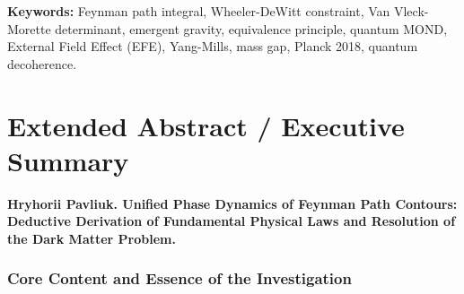 \documentclass[11pt,a4paper]{article}
\theoremstyle{definition}
\begin{document}
\vspace{1em}
\noindent\textbf{Keywords:} Feynman path integral, Wheeler-DeWitt constraint, Van Vleck-Morette determinant, emergent gravity, equivalence principle, quantum MOND, External Field Effect (EFE), Yang-Mills, mass gap, Planck 2018, quantum decoherence.

\clearpage

\section*{Extended Abstract / Executive Summary}

\textbf{Hryhorii Pavliuk. Unified Phase Dynamics of Feynman Path Contours: Deductive Derivation of Fundamental Physical Laws and Resolution of the Dark Matter Problem.}

\subsubsection*{Core Content and Essence of the Investigation}
\end{document}
